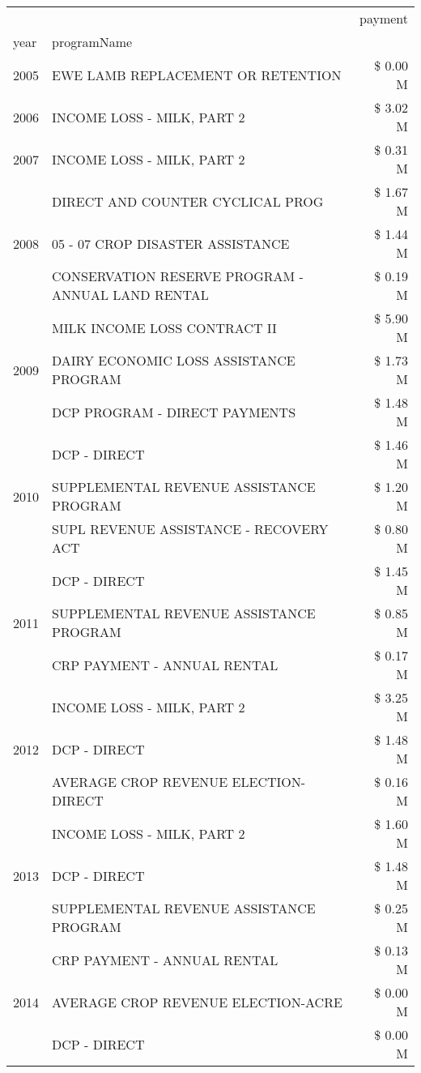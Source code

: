 \begin{tabular}{llr}
\toprule
 &  & payment \\
year & programName &  \\
\midrule
2005 & EWE LAMB REPLACEMENT OR RETENTION & \$ 0.00 M \\
\cline{1-3}
2006 & INCOME LOSS - MILK, PART 2 & \$ 3.02 M \\
\cline{1-3}
2007 & INCOME LOSS - MILK, PART 2 & \$ 0.31 M \\
\cline{1-3}
\multirow[t]{3}{*}{2008} & DIRECT AND COUNTER CYCLICAL PROG & \$ 1.67 M \\
 & 05 - 07 CROP DISASTER ASSISTANCE & \$ 1.44 M \\
 & CONSERVATION RESERVE PROGRAM - ANNUAL LAND RENTAL & \$ 0.19 M \\
\cline{1-3}
\multirow[t]{3}{*}{2009} & MILK INCOME LOSS CONTRACT II & \$ 5.90 M \\
 & DAIRY ECONOMIC LOSS ASSISTANCE PROGRAM & \$ 1.73 M \\
 & DCP PROGRAM - DIRECT PAYMENTS & \$ 1.48 M \\
\cline{1-3}
\multirow[t]{3}{*}{2010} & DCP - DIRECT & \$ 1.46 M \\
 & SUPPLEMENTAL REVENUE ASSISTANCE PROGRAM & \$ 1.20 M \\
 & SUPL REVENUE ASSISTANCE - RECOVERY ACT & \$ 0.80 M \\
\cline{1-3}
\multirow[t]{3}{*}{2011} & DCP - DIRECT & \$ 1.45 M \\
 & SUPPLEMENTAL REVENUE ASSISTANCE PROGRAM & \$ 0.85 M \\
 & CRP PAYMENT - ANNUAL RENTAL & \$ 0.17 M \\
\cline{1-3}
\multirow[t]{3}{*}{2012} & INCOME LOSS - MILK, PART 2 & \$ 3.25 M \\
 & DCP - DIRECT & \$ 1.48 M \\
 & AVERAGE CROP REVENUE ELECTION-DIRECT & \$ 0.16 M \\
\cline{1-3}
\multirow[t]{3}{*}{2013} & INCOME LOSS - MILK, PART 2 & \$ 1.60 M \\
 & DCP - DIRECT & \$ 1.48 M \\
 & SUPPLEMENTAL REVENUE ASSISTANCE PROGRAM & \$ 0.25 M \\
\cline{1-3}
\multirow[t]{3}{*}{2014} & CRP PAYMENT - ANNUAL RENTAL & \$ 0.13 M \\
 & AVERAGE CROP REVENUE ELECTION-ACRE & \$ 0.00 M \\
 & DCP - DIRECT & \$ 0.00 M \\
\cline{1-3}

\end{tabular}
